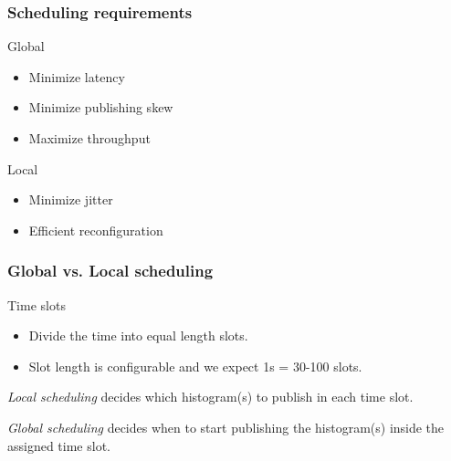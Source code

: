 \documentclass[]{prezentare}
\begin{document}
\begin{frame}
	\frametitle{Scheduling requirements}
	\begin{block}{Global}
		\begin{itemize}
			\item Minimize latency
			\item Minimize publishing skew
			\item Maximize throughput
		\end{itemize}
	\end{block}

	\begin{block}{Local}
		\begin{itemize}
			\item Minimize jitter
			\item Efficient reconfiguration
		\end{itemize}
	\end{block}
	
\end{frame}
\begin{frame}
	\frametitle{Global vs. Local scheduling}
	\begin{block}{Time slots}
	\begin{itemize}
	\item Divide the time into equal length slots. 
	\item Slot length is configurable and we expect 1s = 30-100 slots.
	\end{itemize}	
	\end{block}

	\begin{definition}
	\emph{Local scheduling} decides which histogram(s) to publish in each time slot.
	\end{definition}

	\begin{definition}
	\emph{Global scheduling} decides when to start publishing the histogram(s) inside the assigned time slot.
	\end{definition}

\end{frame}
\end{document}
